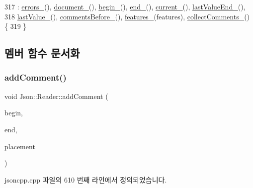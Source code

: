 \begin{DoxyCode}
317     : \hyperlink{class_json_1_1_reader_a1bbce45dc4df753bed60c129f4b5147c}{errors\_}(), \hyperlink{class_json_1_1_reader_abf99e137bc92a93623dc97598702261a}{document\_}(), \hyperlink{class_json_1_1_reader_a327166839022ea91f0a8290960a8af76}{begin\_}(), \hyperlink{class_json_1_1_reader_a714793579cbf4ee7c5a7223d2c8d77c1}{end\_}(), 
      \hyperlink{class_json_1_1_reader_a2f2feb5201a26da7aa133d2f7434479b}{current\_}(), \hyperlink{class_json_1_1_reader_a497a114f7b760f1b794b8fff9876615a}{lastValueEnd\_}(),
318       \hyperlink{class_json_1_1_reader_a87cc75ae5adc6a6755f0ba1c7255ff6c}{lastValue\_}(), \hyperlink{class_json_1_1_reader_af777967adaf0b2e882efa07673754381}{commentsBefore\_}(), \hyperlink{class_json_1_1_reader_aa9984ff8f519b5541346157b7aebf97b}{features\_}(features), 
      \hyperlink{class_json_1_1_reader_a8e9ce743f6004f0596692f0a9ee4626c}{collectComments\_}() \{
319 \}
\end{DoxyCode}


\subsection{멤버 함수 문서화}
\mbox{\label{class_json_1_1_reader_aaea3bd62d12ffb6117a61476c0685049}} 
\subsubsection{\texorpdfstring{add\+Comment()}{addComment()}}
{\footnotesize\ttfamily void Json\+::\+Reader\+::add\+Comment (\begin{DoxyParamCaption}\item[{\hyperlink{class_json_1_1_reader_a46795b5b272bf79a7730e406cb96375a}{Location}}]{begin,  }\item[{\hyperlink{class_json_1_1_reader_a46795b5b272bf79a7730e406cb96375a}{Location}}]{end,  }\item[{\hyperlink{namespace_json_a4fc417c23905b2ae9e2c47d197a45351}{Comment\+Placement}}]{placement }\end{DoxyParamCaption})\hspace{0.3cm}{\ttfamily [private]}}



jsoncpp.\+cpp 파일의 610 번째 라인에서 정의되었습니다.


